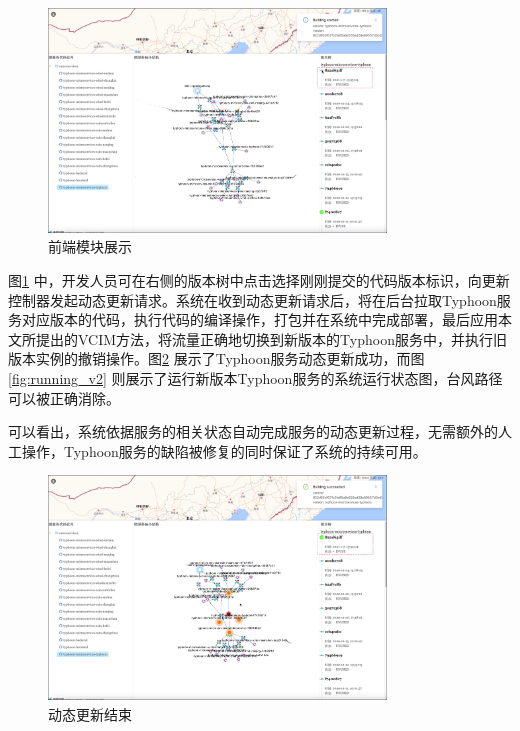 \documentclass[macfonts,master]{njuthesis}
\begin{document}
\begin{figure}[!htbp]
  \centering
  \includegraphics[width= 0.8\textwidth]{image/update_start.png}
  \caption{前端模块展示}
  \label{fig:frontend}
\end{figure}

图\ref{fig:frontend} 中，开发人员可在右侧的版本树中点击选择刚刚提交的代码版本标识，向更新控制器发起动态更新请求。系统在收到动态更新请求后，将在后台拉取Typhoon服务对应版本的代码，执行代码的编译操作，打包并在系统中完成部署，最后应用本文所提出的VCIM方法，将流量正确地切换到新版本的Typhoon服务中，并执行旧版本实例的撤销操作。图\ref{fig:update_end} 展示了Typhoon服务动态更新成功，而图\ref{fig:running_v2} 则展示了运行新版本Typhoon服务的系统运行状态图，台风路径可以被正确消除。

可以看出，系统依据服务的相关状态自动完成服务的动态更新过程，无需额外的人工操作，Typhoon服务的缺陷被修复的同时保证了系统的持续可用。

\begin{figure}[!htbp]
  \centering
  \includegraphics[width= 0.8\textwidth]{image/update_end.png}
  \caption{动态更新结束}
  \label{fig:update_end}
\end{figure}
\end{document}
